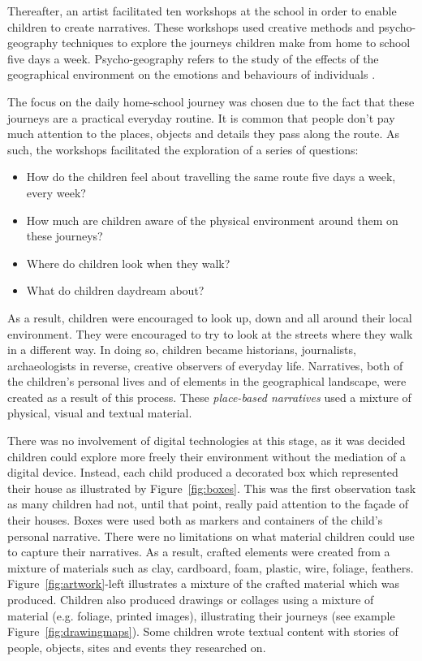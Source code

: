 \documentclass{egpubl}
\begin{document}
Thereafter, an artist facilitated ten workshops at the school in order to
enable children to create narratives. These workshops used creative methods
and psycho-geography techniques to explore the journeys children make from home
to school five days a week. Psycho-geography refers to the study of the effects
of the geographical environment on the emotions and behaviours of individuals
\cite{coverley2006psychogeography}. 

The focus on the daily home-school journey was chosen due to the fact that
these journeys are a practical everyday routine. It is common that people
don't pay much attention to the places, objects and details they pass along
the route. As such, the workshops facilitated the exploration of a series of
questions:

\begin{itemize} 
  \item How do the children feel about travelling the same route five days a week, every week?   
  \item How much are children aware of the physical environment around them on these journeys? 
  \item Where do children look when they walk? 
  \item What do children daydream about? 
\end{itemize}

As a result, children were encouraged to look up, down and all around their
local environment. They were encouraged to try to look at the streets where
they walk in a different way. In doing so, children became historians,
journalists, archaeologists in reverse, creative observers of everyday life.
Narratives, both of the children's personal lives and of elements in the
geographical landscape, were created as a result of this process. These
\emph{place-based narratives} used a mixture of physical, visual and textual
material. 

There was no involvement of digital technologies at this stage, as it was
decided children could explore more freely their environment without the
mediation of a digital device. Instead, each child produced a decorated box
which represented their house as illustrated by Figure~\ref{fig:boxes}. This
was the first observation task as many children had not, until that point,
really paid attention to the fa\c{c}ade of their houses. Boxes were used both
as markers and containers of the child's personal narrative. There were no
limitations on what material children could use to capture their narratives.
As a result, crafted elements were created from a mixture of materials such as
clay, cardboard, foam, plastic, wire, foliage, feathers.
Figure~\ref{fig:artwork}-left illustrates a mixture of the crafted material
which was produced. Children also produced drawings or collages using a
mixture of material (e.g. foliage, printed images), illustrating their
journeys (see example Figure~\ref{fig:drawingmaps}). Some children wrote
textual content with stories of people, objects, sites and events they
researched on. 
\end{document}
